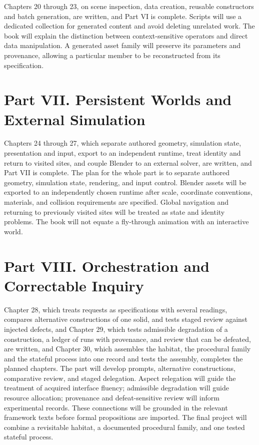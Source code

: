 \documentclass[11pt,openany]{book}
\begin{document}
Chapters 20 through 23, on scene inspection, data creation, reusable constructors and batch generation, are written, and Part VI is complete. Scripts will use a dedicated collection for generated content and avoid deleting unrelated work. The book will explain the distinction between context-sensitive operators and direct data manipulation. A generated asset family will preserve its parameters and provenance, allowing a particular member to be reconstructed from its specification.

\section*{Part VII. Persistent Worlds and External Simulation}

Chapters 24 through 27, which separate authored geometry, simulation state, presentation and input, export to an independent runtime, treat identity and return to visited sites, and couple Blender to an external solver, are written, and Part VII is complete. The plan for the whole part is to separate authored geometry, simulation state, rendering, and input control. Blender assets will be exported to an independently chosen runtime after scale, coordinate conventions, materials, and collision requirements are specified. Global navigation and returning to previously visited sites will be treated as state and identity problems. The book will not equate a fly-through animation with an interactive world.

\section*{Part VIII. Orchestration and Correctable Inquiry}

Chapter 28, which treats requests as specifications with several readings, compares alternative constructions of one solid, and tests staged review against injected defects, and Chapter 29, which tests admissible degradation of a construction, a ledger of runs with provenance, and review that can be defeated, are written, and Chapter 30, which assembles the habitat, the procedural family and the stateful process into one record and tests the assembly, completes the planned chapters. The part will develop prompts, alternative constructions, comparative review, and staged delegation. Aspect relegation will guide the treatment of acquired interface fluency; admissible degradation will guide resource allocation; provenance and defeat-sensitive review will inform experimental records. These connections will be grounded in the relevant framework texts before formal propositions are imported. The final project will combine a revisitable habitat, a documented procedural family, and one tested stateful process.
\end{document}
